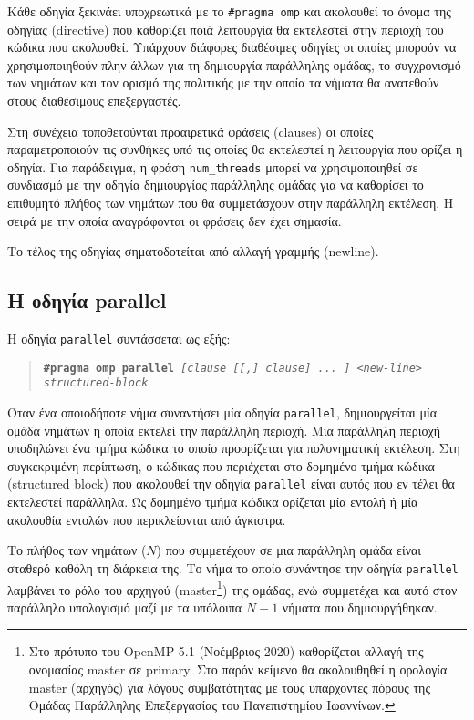 \noindent Κάθε οδηγία ξεκινάει υποχρεωτικά με το \texttt{\#pragma omp} και ακολουθεί το όνομα της οδηγίας (directive) που καθορίζει ποιά λειτουργία θα εκτελεστεί στην περιοχή του κώδικα που ακολουθεί. Υπάρχουν διάφορες διαθέσιμες οδηγίες οι οποίες μπορούν να χρησιμοποιηθούν πλην άλλων για τη δημιουργία παράλληλης ομάδας, το συγχρονισμό των νημάτων και τον ορισμό της πολιτικής με την οποία τα νήματα θα ανατεθούν στους διαθέσιμους επεξεργαστές.

Στη συνέχεια τοποθετούνται προαιρετικά φράσεις (clauses) οι οποίες παραμετροποιούν τις συνθήκες υπό τις οποίες θα εκτελεστεί η λειτουργία που ορίζει η οδηγία. Για παράδειγμα, η φράση \texttt{num\_threads} μπορεί να χρησιμοποιηθεί σε συνδιασμό με την οδηγία δημιουργίας παράλληλης ομάδας για να καθορίσει το επιθυμητό πλήθος των νημάτων που θα συμμετάσχουν στην παράλληλη εκτέλεση. Η σειρά με την οποία αναγράφονται οι φράσεις δεν έχει σημασία.

Το τέλος της οδηγίας σηματοδοτείται από αλλαγή γραμμής (newline).

\subsection{Η οδηγία parallel}
Η οδηγία \texttt{parallel} συντάσσεται ως εξής:

\begin{quote}
	\texttt{\textbf{\#pragma omp parallel} \textit{[clause [[,] clause] ... ] <new-line>}} \\
		\texttt{\textit{structured-block}}
\end{quote}

Όταν ένα οποιοδήποτε νήμα συναντήσει μία οδηγία \texttt{parallel}, δημιουργείται μία ομάδα νημάτων η οποία εκτελεί την παράλληλη περιοχή. Μια παράλληλη περιοχή υποδηλώνει ένα τμήμα κώδικα το οποίο προορίζεται για πολυνηματική εκτέλεση. Στη συγκεκριμένη περίπτωση, ο κώδικας που περιέχεται στο δομημένο τμήμα κώδικα (structured block) που ακολουθεί την οδηγία \texttt{parallel} είναι αυτός που εν τέλει θα εκτελεστεί παράλληλα. Ώς δομημένο τμήμα κώδικα ορίζεται μία εντολή ή μία ακολουθία εντολών που περικλείονται από άγκιστρα.

Το πλήθος των νημάτων ($N$) που συμμετέχουν σε μια παράλληλη ομάδα είναι σταθερό καθόλη τη διάρκεια της. Το νήμα το οποίο συνάντησε την οδηγία \texttt{parallel} λαμβάνει το ρόλο του αρχηγού (master\footnote{Στο πρότυπο του OpenMP 5.1 (Νοέμβριος 2020) καθορίζεται αλλαγή της ονομασίας master σε primary. Στο παρόν κείμενο θα ακολουθηθεί η ορολογία master (αρχηγός) για λόγους συμβατότητας με τους υπάρχοντες πόρους της Ομάδας Παράλληλης Επεξεργασίας του Πανεπιστημίου Ιωαννίνων.}) της ομάδας, ενώ συμμετέχει και αυτό στον παράλληλο υπολογισμό μαζί με τα υπόλοιπα $N-1$ νήματα που δημιουργήθηκαν.


